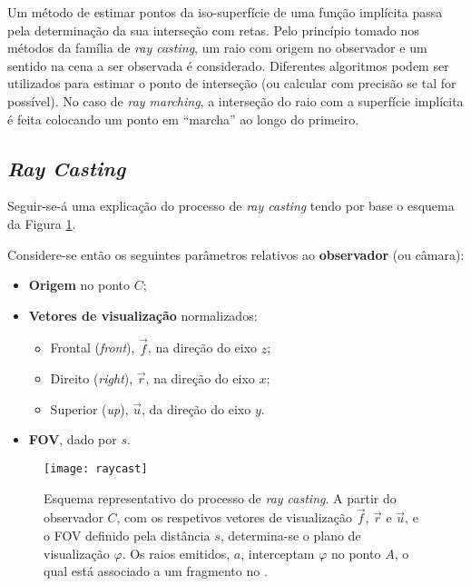Um método de estimar pontos da iso-superfície de uma função implícita passa pela determinação da sua interseção com retas. Pelo princípio tomado nos métodos da família de \textit{ray casting}, um raio com origem no observador e um sentido na cena a ser observada é considerado. Diferentes algoritmos podem ser utilizados para estimar o ponto de interseção (ou calcular com precisão se tal for possível). No caso de \textit{ray marching}, a interseção do raio com a superfície implícita é feita colocando um ponto em ``marcha'' ao longo do primeiro.

\subsection{\textit{Ray Casting}}
\label{ssec::arte:raymarch:cast}

Seguir-se-á uma explicação do processo de \textit{ray casting} tendo por base o esquema da Figura \ref{fig::raycast}.

Considere-se então os seguintes parâmetros relativos ao \textbf{observador} (ou câmara):

\begin{itemize}
	\item \textbf{Origem} no ponto $C$;
	\item \textbf{Vetores de visualização} normalizados:
	\begin{itemize}[nosep]
		\item Frontal (\textit{front}), $\overrightarrow{f}$, na direção do eixo $z$;
		\item Direito (\textit{right}), $\overrightarrow{r}$, na direção do eixo $x$;
		\item Superior (\textit{up}), $\overrightarrow{u}$, da direção do eixo $y$.
	\end{itemize}
	\item \textbf{\acf{FOV}}, dado por $s$.
\end{itemize}

\begin{figure}[!bp]
	\centering
	\texttt{[image: raycast]}
	\caption[Esquema do processo de \textit{ray casting}]{Esquema representativo do processo de \textit{ray casting}. A partir do observador $C$, com os respetivos vetores de visualização $\overrightarrow{f}$, $\overrightarrow{r}$ e $\overrightarrow{u}$, e o \acs{FOV} definido pela distância $s$, determina-se o plano de visualização $\varphi$. Os raios emitidos, $a$, interceptam $\varphi$ no ponto $A$, o qual está associado a um fragmento no \opengl.}
	\label{fig::raycast}
\end{figure}

